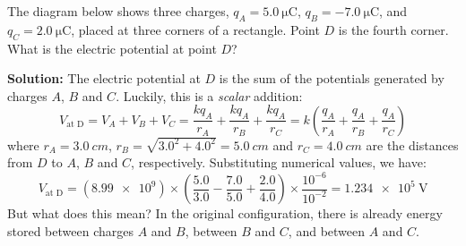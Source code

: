 \begin{example}
  The diagram below shows three charges, $q_A=\SI{5.0}{\micro\coulomb}$,
  $q_B=\SI{-7.0}{\micro\coulomb}$, and $q_C=\SI{2.0}{\micro\coulomb}$, placed
  at three corners of a rectangle. Point $D$ is the fourth corner. What is the
  electric potential at point $D$?
  \begin{center}
    \vspace{-.25in}
  \end{center}
  \vspace{-.2in}
  \textbf{Solution:} The electric potential at $D$ is the sum of the potentials
  generated by charges $A$, $B$ and $C$. Luckily, this is a \emph{scalar}
  addition:
  \begin{equation*}
    V_\text{at D}=V_A + V_B + V_C =
    \frac{kq_A}{r_A}+\frac{kq_A}{r_B}+\frac{kq_A}{r_C} =
    k\left(\frac{q_A}{r_A}+\frac{q_A}{r_B}+\frac{q_A}{r_C}\right)
  \end{equation*}
  where $r_A=\SI{3.0}{cm}$, $r_B=\sqrt{3.0^2+4.0^2}=\SI{5.0}{cm}$ and
  $r_C=\SI{4.0}{cm}$ are the distances from $D$ to $A$, $B$ and $C$,
  respectively. Substituting numerical values, we have:
  \begin{equation*}
    V_\text{at D} =
    (\num{8.99e9})\times
    \left(\frac{5.0}{3.0}-\frac{7.0}{5.0}+\frac{2.0}{4.0}\right)
    \times\frac{10^{-6}}{10^{-2}}=\boxed{\SI{1.234e5}{\volt}}
  \end{equation*}
  But what does this mean? In the original configuration, there is already
  energy stored between charges $A$ and $B$, between $B$ and $C$, and
  between $A$ and $C$.
\end{example}



%
%
%
%
%
%
%
%
%

